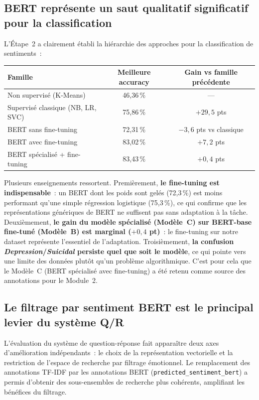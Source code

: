 \documentclass[12pt,a4paper]{report}
\renewcommand{\arraystretch}{1}
\begin{document}
\subsection{BERT représente un saut qualitatif significatif pour la classification}

L'Étape~2 a clairement établi la hiérarchie des approches pour la classification de sentiments~:

\begin{center}
\renewcommand{\arraystretch}{1.2}
\begin{tabular}{@{}L{5.5cm}cc@{}}
\toprule
\textbf{Famille} & \textbf{Meilleure accuracy} & \textbf{Gain vs famille précédente} \\
\midrule
Non supervisé (K-Means)           & 46,36\,\%  & --- \\
Supervisé classique (NB, LR, SVC) & 75,86\,\%  & $+29{,}5$ pts \\
BERT sans fine-tuning             & 72,31\,\%  & $-3{,}6$ pts vs classique \\
BERT avec fine-tuning             & 83,02\,\%  & $+7{,}2$ pts \\
BERT spécialisé + fine-tuning     & 83,43\,\%  & $+0{,}4$ pts \\
\bottomrule
\end{tabular}
\end{center}

Plusieurs enseignements ressortent. Premièrement, \textbf{le fine-tuning est indispensable}~: un BERT
dont les poids sont gelés (72,3\,\%) est moins performant qu'une simple régression logistique
(75,3\,\%), ce qui confirme que les représentations génériques de BERT ne suffisent pas sans
adaptation à la tâche. Deuxièmement, \textbf{le gain du modèle spécialisé (Modèle~C) sur BERT-base
fine-tuné (Modèle~B) est marginal ($+0{,}4$ pt)}~: le fine-tuning sur notre dataset représente
l'essentiel de l'adaptation. Troisièmement, \textbf{la confusion \textit{Depression}/\textit{Suicidal}
persiste quel que soit le modèle}, ce qui pointe vers une limite des données plutôt qu'un
problème algorithmique. C'est pour cela que le Modèle~C (BERT spécialisé avec fine-tuning) a été retenu
comme source des annotations pour le Module~2.

\subsection{Le filtrage par sentiment BERT est le principal levier du système Q/R}

L'évaluation du système de question-réponse fait apparaître deux axes d'amélioration
indépendants~: le choix de la représentation vectorielle et la restriction de l'espace de
recherche par filtrage émotionnel. Le remplacement des annotations TF-IDF par les
annotations BERT (\texttt{predicted\_sentiment\_bert}) a permis d'obtenir des sous-ensembles
de recherche plus cohérents, amplifiant les bénéfices du filtrage.
\end{document}
